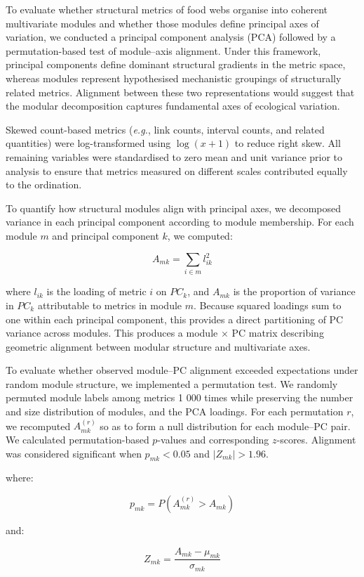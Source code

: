 \documentclass[
]{article}
\begin{document}
To evaluate whether structural metrics of food webs organise into
coherent multivariate modules and whether those modules define principal
axes of variation, we conducted a principal component analysis (PCA)
followed by a permutation-based test of module--axis alignment. Under
this framework, principal components define dominant structural
gradients in the metric space, whereas modules represent hypothesised
mechanistic groupings of structurally related metrics. Alignment between
these two representations would suggest that the modular decomposition
captures fundamental axes of ecological variation.

Skewed count-based metrics (\emph{e.g.}, link counts, interval counts,
and related quantities) were log-transformed using \(\log(x + 1)\) to
reduce right skew. All remaining variables were standardised to zero
mean and unit variance prior to analysis to ensure that metrics measured
on different scales contributed equally to the ordination.

To quantify how structural modules align with principal axes, we
decomposed variance in each principal component according to module
membership. For each module \(m\) and principal component \(k\), we
computed:

\[ 
A_{mk} = \sum_{i \in m} l^{2}_{ik}
\]

where \(l_{ik}\) is the loading of metric \(i\) on \(PC_k\), and
\(A_{mk}\) is the proportion of variance in \(PC_k\) attributable to
metrics in module \(m\). Because squared loadings sum to one within each
principal component, this provides a direct partitioning of PC variance
across modules. This produces a module × PC matrix describing geometric
alignment between modular structure and multivariate axes.

To evaluate whether observed module--PC alignment exceeded expectations
under random module structure, we implemented a permutation test. We
randomly permuted module labels among metrics 1 000 times while
preserving the number and size distribution of modules, and the PCA
loadings. For each permutation \(r\), we recomputed \(A^{(r)}_{mk}\) so
as to form a null distribution for each module--PC pair. We calculated
permutation-based \(p\)-values and corresponding \(z\)-scores. Alignment
was considered significant when \(p_{mk} < 0.05\) and
\(|Z_{mk}| > 1.96\).

where:

\[ 
p_{mk} = P(A^{(r)}_{mk} > A_{mk})
\]

and:

\[ 
Z_{mk} = \frac{A_{mk} - \mu_{mk}}{\sigma_{mk}}
\]
\end{document}
